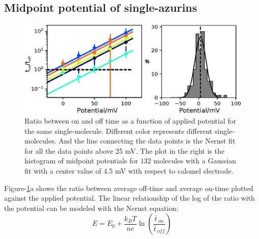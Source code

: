 \documentclass[journal=jacsat,manuscript=article]{achemso}
\newcommand*\me[1]{\ensuremath{\bar{#1}\,}}
\begin{document}
\subsection{Midpoint potential of single-azurins}
\begin{figure}
	\centering
	\includegraphics[]{Figure_2_midpoint.eps}
	\caption{Ratio between on and off time as a function of applied potential for the same single-molecule. Different color represents different single-molecules. And the line connecting the data points is the Nernst fit for all the data points above 25 mV. The plot in the right is the histogram of midpoint potentials for $132$ molecules with a Gaussian fit with a center value of 4.5 mV with respect to calomel electrode.}
	\label{fig:midpoint}
\end{figure}
Figure-\ref{fig:midpoint}a shows the ratio between average off-time and average on-time plotted against the applied potential. The linear relationship of the log of the ratio with the potential can be modeled with the Nernst equation: 
\begin{equation}
	E = E_0 + \frac{k_BT}{n e}\ln\left(\frac{\me{t}_{on}}{\me{t}_{off}}\right)\,
	\label{eq:nernst}
\end{equation}
\end{document}
